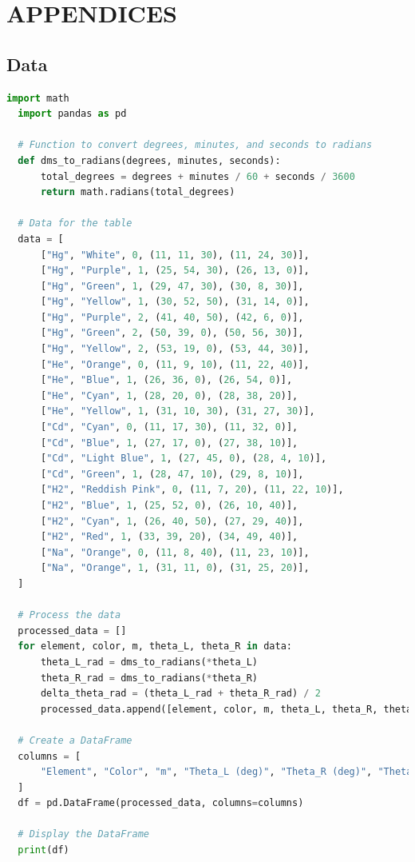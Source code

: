 \documentclass[a4paper,11pt]{article}
\begin{document}
\printbibliography[heading=none]

\newpage
\section*{\center APPENDICES}
\label{sec:APPENDICES}
%
\subsection*{Data}
\begin{lstlisting}[language=Python]
  import math
  import pandas as pd
  
  # Function to convert degrees, minutes, and seconds to radians
  def dms_to_radians(degrees, minutes, seconds):
      total_degrees = degrees + minutes / 60 + seconds / 3600
      return math.radians(total_degrees)
  
  # Data for the table
  data = [
      ["Hg", "White", 0, (11, 11, 30), (11, 24, 30)],
      ["Hg", "Purple", 1, (25, 54, 30), (26, 13, 0)],
      ["Hg", "Green", 1, (29, 47, 30), (30, 8, 30)],
      ["Hg", "Yellow", 1, (30, 52, 50), (31, 14, 0)],
      ["Hg", "Purple", 2, (41, 40, 50), (42, 6, 0)],
      ["Hg", "Green", 2, (50, 39, 0), (50, 56, 30)],
      ["Hg", "Yellow", 2, (53, 19, 0), (53, 44, 30)],
      ["He", "Orange", 0, (11, 9, 10), (11, 22, 40)],
      ["He", "Blue", 1, (26, 36, 0), (26, 54, 0)],
      ["He", "Cyan", 1, (28, 20, 0), (28, 38, 20)],
      ["He", "Yellow", 1, (31, 10, 30), (31, 27, 30)],
      ["Cd", "Cyan", 0, (11, 17, 30), (11, 32, 0)],
      ["Cd", "Blue", 1, (27, 17, 0), (27, 38, 10)],
      ["Cd", "Light Blue", 1, (27, 45, 0), (28, 4, 10)],
      ["Cd", "Green", 1, (28, 47, 10), (29, 8, 10)],
      ["H2", "Reddish Pink", 0, (11, 7, 20), (11, 22, 10)],
      ["H2", "Blue", 1, (25, 52, 0), (26, 10, 40)],
      ["H2", "Cyan", 1, (26, 40, 50), (27, 29, 40)],
      ["H2", "Red", 1, (33, 39, 20), (34, 49, 40)],
      ["Na", "Orange", 0, (11, 8, 40), (11, 23, 10)],
      ["Na", "Orange", 1, (31, 11, 0), (31, 25, 20)],
  ]
  
  # Process the data
  processed_data = []
  for element, color, m, theta_L, theta_R in data:
      theta_L_rad = dms_to_radians(*theta_L)
      theta_R_rad = dms_to_radians(*theta_R)
      delta_theta_rad = (theta_L_rad + theta_R_rad) / 2
      processed_data.append([element, color, m, theta_L, theta_R, theta_L_rad, theta_R_rad, delta_theta_rad])
  
  # Create a DataFrame
  columns = [
      "Element", "Color", "m", "Theta_L (deg)", "Theta_R (deg)", "Theta_L (rad)", "Theta_R (rad)", "Delta Theta (rad)"
  ]
  df = pd.DataFrame(processed_data, columns=columns)
  
  # Display the DataFrame
  print(df)
  
\end{lstlisting}
\newpage
\end{document}
